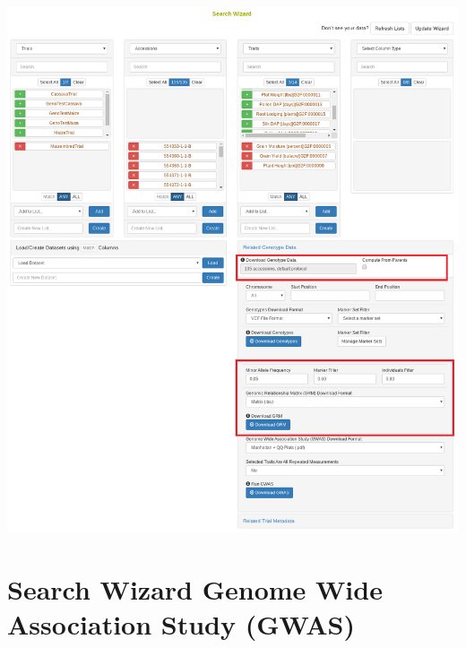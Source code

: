 \documentclass[
  12pt,
]{book}
\begin{document}
\begin{center}\includegraphics[width=0.95\linewidth]{assets/images/search_wizard_genotype_analyses_grm} \end{center}

\hypertarget{search-wizard-genome-wide-association-study-gwas}{%
\section{Search Wizard Genome Wide Association Study (GWAS)}\label{search-wizard-genome-wide-association-study-gwas}}
\end{document}
